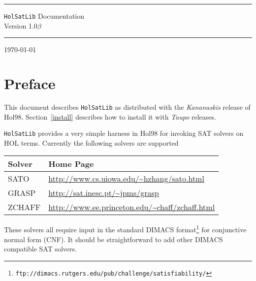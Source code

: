 \documentclass[12pt]{article}
\newcommand\HOL{HOL\xspace}
\begin{document}
\thispagestyle{empty}

\hrule height5pt

\begin{flushleft}\Huge
{\tt HolSatLib} Documentation\\
{\Large Version 1.0$\beta$}
\end{flushleft}

\vspace*{2mm}

\hrule height5pt

\vspace*{1cm}



\vspace*{5mm}

\today

\vfill

{\setlength{\fboxrule}{0.5mm}
\setlength{\fboxsep}{2mm}
}

\vfill

\newpage


\section*{Preface}



This document describes {\tt{HolSatLib}}
as distributed with the {\it Kananaskis\/} release of Hol98. Section~\ref{install}
describes how to install it with {\it Taupo} releases.

{\tt{HolSatLib}} provides a very simple harness in Hol98 for
invoking SAT solvers on \HOL terms. Currently the following
solvers are supported

\medskip

\begin{tabular}{ll}
{\bf Solver} & {\bf Home Page} \\ \hline
SATO & {\small\url{http://www.cs.uiowa.edu/~hzhang/sato.html}}\\
GRASP & {\small\url{http://sat.inesc.pt/~jpms/grasp}}\\
ZCHAFF & {\small\url{http://www.ee.princeton.edu/~chaff/zchaff.html}}
\end{tabular}

\medskip

These solvers all require input in the standard DIMACS 
format\footnote{\small\tt ftp://dimacs.rutgers.edu/pub/challenge/satisfiability/}
for conjunctive normal form (CNF). It should be straightforward to add other
DIMACS compatible SAT solvers.
\end{document}
